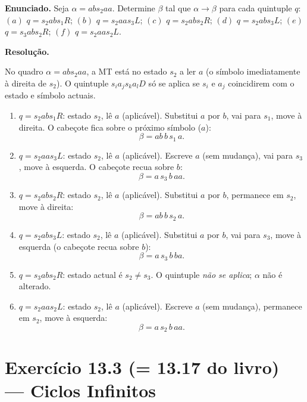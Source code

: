 \documentclass[12pt,a4paper]{article}
\begin{document}
\textbf{Enunciado.} Seja $\alpha = abs_2aa$. Determine $\beta$ tal que $\alpha \to \beta$
para cada quintuple $q$:
$(a)$ $q = s_2 a b s_1 R$;\;
$(b)$ $q = s_2 a a s_3 L$;\;
$(c)$ $q = s_2 a b s_2 R$;\;
$(d)$ $q = s_2 a b s_3 L$;\;
$(e)$ $q = s_3 a b s_2 R$;\;
$(f)$ $q = s_2 a a s_2 L$.

\medskip
\textbf{Resolução.}

No quadro $\alpha = abs_2aa$, a MT está no estado $s_2$ a ler $a$ (o símbolo imediatamente
à direita de $s_2$). O quintuple $s_i a_j s_k a_l D$ só se aplica se $s_i$ e $a_j$
coincidirem com o estado e símbolo actuais.

\begin{enumerate}[label=(\alph*)]
  \item $q = s_2 a b s_1 R$: estado $s_2$, lê $a$ (aplicável). Substitui $a$ por $b$, vai para $s_1$,
        move à direita. O cabeçote fica sobre o próximo símbolo ($a$):
        \[
          \beta = ab\,b\,s_1\,a.
        \]

  \item $q = s_2 a a s_3 L$: estado $s_2$, lê $a$ (aplicável). Escreve $a$ (sem mudança), vai para $s_3$,
        move à esquerda. O cabeçote recua sobre $b$:
        \[
          \beta = a\,s_3\,b\,aa.
        \]

  \item $q = s_2 a b s_2 R$: estado $s_2$, lê $a$ (aplicável). Substitui $a$ por $b$, permanece em $s_2$,
        move à direita:
        \[
          \beta = ab\,b\,s_2\,a.
        \]

  \item $q = s_2 a b s_3 L$: estado $s_2$, lê $a$ (aplicável). Substitui $a$ por $b$, vai para $s_3$,
        move à esquerda (o cabeçote recua sobre $b$):
        \[
          \beta = a\,s_3\,b\,ba.
        \]

  \item $q = s_3 a b s_2 R$: estado actual é $s_2 \ne s_3$. O quintuple \emph{não se aplica};
        $\alpha$ não é alterado.

  \item $q = s_2 a a s_2 L$: estado $s_2$, lê $a$ (aplicável). Escreve $a$ (sem mudança), permanece em
        $s_2$, move à esquerda:
        \[
          \beta = a\,s_2\,b\,aa.
        \]
\end{enumerate}

\section*{Exercício 13.3 (= 13.17 do livro) — Ciclos Infinitos}
\end{document}
